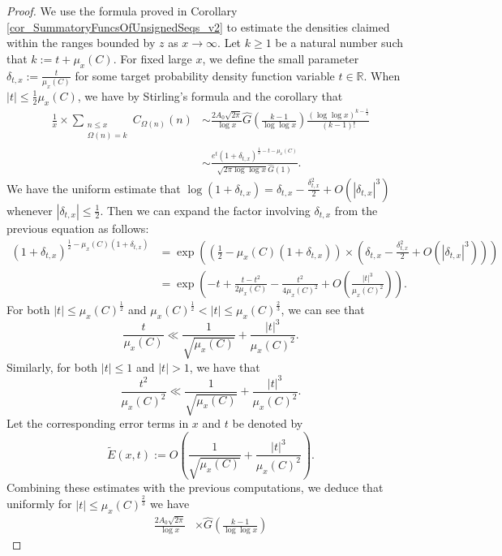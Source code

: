 \documentclass[11pt,reqno,a4letter]{article}
\numberwithin{figure}{section}
\numberwithin{table}{section}
\theoremstyle{plain}
\numberwithin{theorem}{section}
\theoremstyle{definition}
\begin{document}
\begin{proof}
We use the formula proved in Corollary \ref{cor_SummatoryFuncsOfUnsignedSeqs_v2} 
to estimate the densities claimed within the ranges bounded by 
$z$ as $x \rightarrow \infty$. 
Let $k \geq 1$ be a natural number such that $k := t + \mu_x(C)$.  
For fixed large $x$, we define the small parameter $\delta_{t,x} := \frac{t}{\mu_x(C)}$ 
for some target probability density function variable $t \in \mathbb{R}$. 
When $|t| \leq \frac{1}{2} \mu_x(C)$, we have by Stirling's formula and the 
corollary that 
\begin{align*} 
\frac{1}{x} \times \sum_{\substack{n \leq x \\ \Omega(n)=k}} C_{\Omega(n)}(n) & 
     \sim 
     \frac{2A_0\sqrt{2\pi}}{\log x} \widehat{G}\left(\frac{k-1}{\log\log x}\right) 
     \frac{(\log\log x)^{k-\frac{1}{2}}}{(k-1)!} \\ 
     & \sim 
     \frac{e^{t} (1+\delta_{t,x})^{\frac{1}{2}-t-\mu_x(C)}}{\sqrt{2\pi \log\log x} \widehat{G}(1)}.  
\end{align*} 
We have the uniform estimate that 
$\log(1+\delta_{t,x}) = \delta_{t,x} - \frac{\delta_{t,x}^2}{2} + O(|\delta_{t,x}|^3)$ whenever 
$|\delta_{t,x}| \leq \frac{1}{2}$. Then we can expand the factor involving $\delta_{t,x}$ 
from the previous equation as follows: 
\begin{align*} 
(1+\delta_{t,x})^{\frac{1}{2}-\mu_x(C) (1+\delta_{t,x})} & = 
     \exp\left(\left(\frac{1}{2}-\mu_x(C) (1+\delta_{t,x})\right) \times 
     \left(\delta_{t,x} - \frac{\delta_{t,x}^2}{2} + O(|\delta_{t,x}|^3)\right)\right) \\ 
     & = \exp\left(-t + \frac{t-t^2}{2\mu_x(C)} - \frac{t^2}{4\mu_x(C)^2} + 
     O\left(\frac{|t|^3}{\mu_x(C)^2}\right)\right). 
\end{align*} 
For both $|t| \leq \mu_x(C)^{\frac{1}{2}}$ and 
$\mu_x(C)^{\frac{1}{2}} < |t| \leq \mu_x(C)^{\frac{2}{3}}$, 
we can see that 
\[
\frac{t}{\mu_x(C)} \ll \frac{1}{\sqrt{\mu_x(C)}} + \frac{|t|^3}{\mu_x(C)^2}. 
\]
Similarly, for both  $|t| \leq 1$ and $|t| > 1$, we have that 
\[
\frac{t^2}{\mu_x(C)^2} \ll \frac{1}{\sqrt{\mu_x(C)}} + 
     \frac{|t|^3}{\mu_x(C)^2}. 
\] 
Let the corresponding error terms in $x$ and $t$ be denoted by 
\[
\widetilde{E}(x, t) := O\left(\frac{1}{\sqrt{\mu_x(C)}} + \frac{|t|^3}{\mu_x(C)^2}\right). 
\]
Combining these estimates with the previous computations, we deduce that 
uniformly for $|t| \leq \mu_x(C)^{\frac{2}{3}}$ we have 
\begin{align*} 
\frac{2A_0\sqrt{2\pi}}{\log x} & \times \widehat{G}\left(\frac{k-1}{\log\log x}\right) 

\end{align*}
\end{proof}
\end{document}
